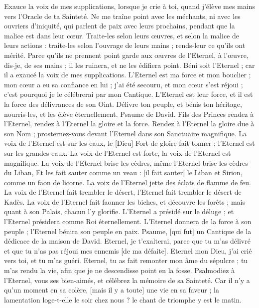 \begin{multicols}{2}
Exauce la voix de mes supplications, lorsque je crie à toi, quand j'élève mes mains vers l'Oracle de ta Sainteté.
Ne me traîne point avec les méchants, ni avec les ouvriers d'iniquité, qui parlent de paix avec leurs prochains, pendant que la malice est dans leur cœur.
Traite-les selon leurs œuvres, et selon la malice de leurs actions : traite-les selon l'ouvrage de leurs mains ; rends-leur ce qu'ils ont mérité.
Parce qu'ils ne prennent point garde aux œuvres de l'Eternel, à l'œuvre, dis-je, de ses mains ; il les ruinera, et ne les édifiera point.
Béni soit l'Eternel ; car il a exaucé la voix de mes supplications.
L'Eternel est ma force et mon bouclier ; mon cœur a eu sa confiance en lui ; j'ai été secouru, et mon cœur s'est réjoui ; c'est pourquoi je le célébrerai par mon Cantique.
L'Eternel est leur force, et il est la force des délivrances de son Oint.
Délivre ton peuple, et bénis ton héritage, nourris-les, et les élève éternellement.
\VerseOne{}Psaume de David. Fils des Princes rendez à l'Eternel, rendez à l'Eternel la gloire et la force.
Rendez à l'Eternel la gloire due à son Nom ; prosternez-vous devant l'Eternel dans son Sanctuaire magnifique.
La voix de l'Eternel est sur les eaux, le [Dieu] Fort de gloire fait tonner ; l'Eternel est sur les grandes eaux.
La voix de l'Eternel est forte, la voix de l'Eternel est magnifique.
La voix de l'Eternel brise les cèdres, même l'Eternel brise les cèdres du Liban,
Et les fait sauter comme un veau : [il fait sauter] le Liban et Sirion, comme un faon de licorne.
La voix de l'Eternel jette des éclats de flamme de feu.
La voix de l'Eternel fait trembler le désert, l'Eternel fait trembler le désert de Kadès.
La voix de l'Eternel fait faonner les biches, et découvre les forêts ; mais quant à son Palais, chacun l'y glorifie.
L'Eternel a présidé sur le déluge ; et l'Eternel présidera comme Roi éternellement.
L'Eternel donnera de la force à son peuple ; l'Eternel bénira son peuple en paix.
\VerseOne{}Psaume, [qui fut] un Cantique de la dédicace de la maison de David. Eternel, je t'exalterai, parce que tu m'as délivré et que tu n'as pas réjoui mes ennemis [de ma défaite].
Eternel mon Dieu, j'ai crié vers toi, et tu m'as guéri.
Eternel, tu as fait remonter mon âme du sépulcre ; tu m'as rendu la vie, afin que je ne descendisse point en la fosse.
Psalmodiez à l'Eternel, vous ses bien-aimés, et célébrez la mémoire de sa Sainteté.
Car il n'y a qu'un moment en sa colère, [mais il y a toute] une vie en sa faveur ; la lamentation loge-t-elle le soir chez nous ? le chant de triomphe y est le matin.

\end{multicols}
